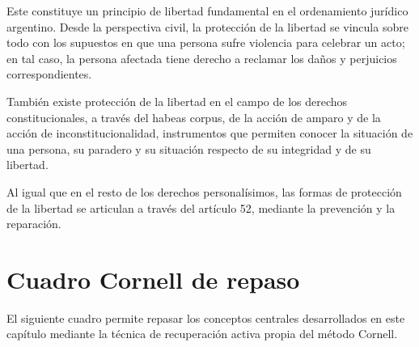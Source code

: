 \documentclass[12pt,oneside]{book}
\begin{document}
Este constituye un principio de libertad fundamental en el ordenamiento jurídico argentino. Desde la perspectiva civil, la protección de la libertad se vincula sobre todo con los supuestos en que una persona sufre violencia para celebrar un acto; en tal caso, la persona afectada tiene derecho a reclamar los daños y perjuicios correspondientes.

También existe protección de la libertad en el campo de los derechos constitucionales, a través del habeas corpus, de la acción de amparo y de la acción de inconstitucionalidad, instrumentos que permiten conocer la situación de una persona, su paradero y su situación respecto de su integridad y de su libertad.

\begin{note}
Al igual que en el resto de los derechos personalísimos, las formas de protección de la libertad se articulan a través del artículo 52, mediante la prevención y la reparación.
\end{note}

\section{Cuadro Cornell de repaso}

El siguiente cuadro permite repasar los conceptos centrales desarrollados en este capítulo mediante la técnica de recuperación activa propia del método Cornell.
\end{document}
